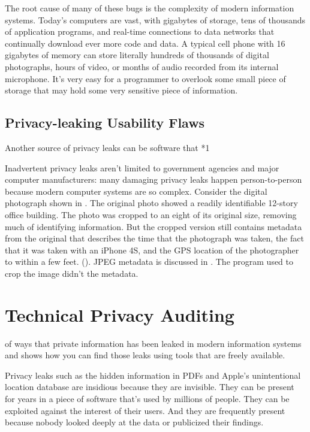 The root cause of many of these bugs is the complexity
of modern information systems. Today's computers are vast, with
gigabytes of storage, tens of thousands of application programs, and
real-time connections to data networks that continually download ever 
more code and data. A typical cell phone with 16 gigabytes of memory can
store literally hundreds of thousands of digital photographs, hours of
video, or months of audio recorded from its internal
microphone. It's very easy for a programmer to overlook some small
piece of storage that may hold some very sensitive piece of
information. 

\subsection{Privacy-leaking Usability Flaws}

Another source of privacy leaks can be software that *1

Inadvertent privacy leaks aren't limited to government agencies and
major computer manufacturers: many damaging privacy leaks happen
person-to-person because modern computer systems are so
complex. Consider the digital photograph shown in . The
original photo showed a readily
identifiable 12-story office building. The photo was cropped to an
eight of its original size, removing much of identifying information. But the cropped
version still contains metadata from the original that
describes the time that the photograph was taken, the fact that it was
taken with an iPhone 4S, and the GPS location of the
photographer to within a few feet. (). JPEG
metadata is discussed in . The program used to crop
the image didn't the metadata.




\section{Technical Privacy Auditing}

of ways that private information has been
leaked in modern information systems and shows how you can find 
those leaks using tools that are freely available. 


Privacy leaks such as the hidden information in PDFs and Apple's
unintentional location database are insidious because they are
invisible. They can be present for years in a piece of software that's
used by millions of people. They can be exploited against the interest
of their users. And they are frequently present because nobody looked
deeply at the data or publicized their findings. 


